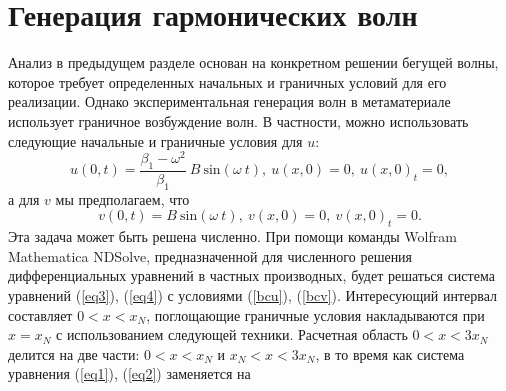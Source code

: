 \section {Генерация гармонических волн}
Анализ в предыдущем разделе основан на конкретном решении бегущей волны, которое требует определенных начальных и граничных условий для его реализации. Однако экспериментальная генерация волн в метаматериале использует граничное возбуждение волн. В частности, можно использовать следующие начальные и граничные условия для $u$:
\begin{equation}\label{bcu}
u(0,t)=\frac{\beta_1-\omega^2}{\beta_1}~B~ {\text{sin}} (\omega ~t),~u(x,0)=0, ~u(x,0)_t=0,
\end{equation}
а для $ v $ мы предполагаем, что
\begin{equation}\label{bcv}
v(0,t)=B ~{\text{sin}} (\omega ~t),~v(x,0)=0, ~v(x,0)_t=0.
\end{equation}
Эта задача может быть решена численно. При помощи команды Wolfram Mathematica NDSolve, предназначенной для численного решения дифференциальных уравнений в частных производных, будет решаться система уравнений (\ref {eq3}), (\ref{eq4}) с условиями (\ref {bcu}), (\ref {bcv}).
Интересующий интервал составляет $ 0 <x < x_N $, поглощающие граничные условия накладываются при $ x = x_N $ с использованием следующей техники. Расчетная область $ 0 <x < 3 x_N $ делится на две части: $ 0 <x <x_N $ и $ x_N <x <3 x_N $, в то время как система уравнения (\ref {eq1}), (\ref {eq2}) заменяется на
